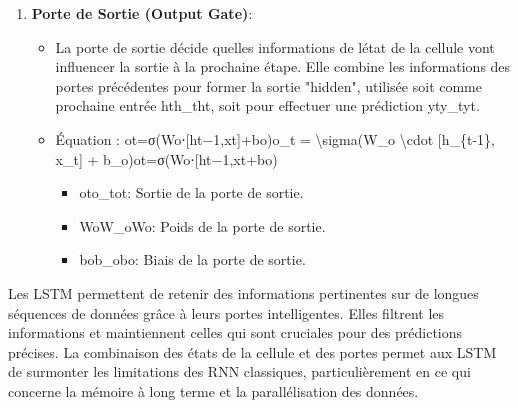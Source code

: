 \documentclass[
]{article}
\begin{document}
\begin{enumerate}
\begin{itemize}
    \begin{itemize}
    \item
      iti\_tit\hspace{0pt}: Sortie de la porte d\textquotesingle entrée.
    \item
      WiW\_iWi\hspace{0pt}: Poids de la porte d\textquotesingle entrée.
    \item
      bib\_ibi\hspace{0pt}: Biais de la porte d\textquotesingle entrée.
    \end{itemize}
  \end{itemize}
\item
  \textbf{Porte de Sortie (Output Gate)}:

  \begin{itemize}
  \item
    La porte de sortie décide quelles informations de
    l\textquotesingle état de la cellule vont influencer la sortie à la
    prochaine étape. Elle combine les informations des portes
    précédentes pour former la sortie "hidden", utilisée soit comme
    prochaine entrée hth\_tht\hspace{0pt}, soit pour effectuer une
    prédiction yty\_tyt\hspace{0pt}.
  \item
    Équation : ot=σ(Wo⋅{[}ht−1,xt{]}+bo)o\_t = \textbackslash sigma(W\_o
    \textbackslash cdot {[}h\_\{t-1\}, x\_t{]} +
    b\_o)ot\hspace{0pt}=σ(Wo\hspace{0pt}⋅{[}ht−1\hspace{0pt},xt\hspace{0pt}{]}+bo\hspace{0pt})

    \begin{itemize}
    \item
      oto\_tot\hspace{0pt}: Sortie de la porte de sortie.
    \item
      WoW\_oWo\hspace{0pt}: Poids de la porte de sortie.
    \item
      bob\_obo\hspace{0pt}: Biais de la porte de sortie.
    \end{itemize}
  \end{itemize}
\end{enumerate}

Les LSTM permettent de retenir des informations pertinentes sur de
longues séquences de données grâce à leurs portes intelligentes. Elles
filtrent les informations et maintiennent celles qui sont cruciales pour
des prédictions précises. La combinaison des états de la cellule et des
portes permet aux LSTM de surmonter les limitations des RNN classiques,
particulièrement en ce qui concerne la mémoire à long terme et la
parallélisation des données.
\end{document}
